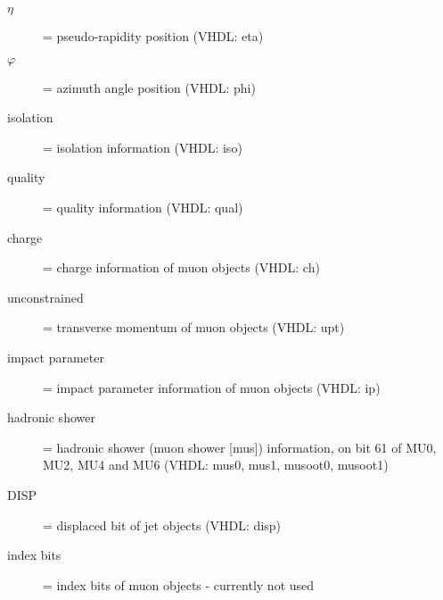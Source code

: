 \begin{description}
\item [{$\eta$}] = pseudo-rapidity position (VHDL: eta)
\item [{$\varphi$}] = azimuth angle position (VHDL: phi)
\item [{isolation}] = isolation information (VHDL: iso)
\item [{quality}] = quality information (VHDL: qual)
\item [{charge}] = charge information of muon objects (VHDL: ch)
\item [{unconstrained \pt}] = transverse momentum of muon objects (VHDL: upt)
\item [{impact parameter}] = impact parameter information of muon objects (VHDL: ip)
\item [{hadronic shower}] = hadronic shower (muon shower [mus]) information, on bit 61 of MU0, MU2, MU4 and MU6 (VHDL: mus0, mus1, musoot0, musoot1)
\item [{DISP}] = displaced bit of jet objects (VHDL: disp)
\item [{index bits}] = index bits of muon objects - currently not used
\end{description}

\clearpage
